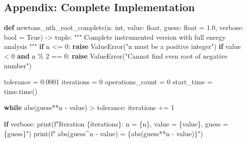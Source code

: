 \documentclass[
  letterpaper,
  DIV=11,
  numbers=noendperiod]{scrartcl}
\newenvironment{Shaded}{\begin{snugshade}}{\end{snugshade}}
\newcommand{\BuiltInTok}[1]{\textcolor[rgb]{0.00,0.23,0.31}{#1}}
\newcommand{\CommentTok}[1]{\textcolor[rgb]{0.37,0.37,0.37}{#1}}
\newcommand{\ControlFlowTok}[1]{\textcolor[rgb]{0.00,0.23,0.31}{\textbf{#1}}}
\newcommand{\DecValTok}[1]{\textcolor[rgb]{0.68,0.00,0.00}{#1}}
\newcommand{\FloatTok}[1]{\textcolor[rgb]{0.68,0.00,0.00}{#1}}
\newcommand{\KeywordTok}[1]{\textcolor[rgb]{0.00,0.23,0.31}{\textbf{#1}}}
\newcommand{\NormalTok}[1]{\textcolor[rgb]{0.00,0.23,0.31}{#1}}
\newcommand{\OperatorTok}[1]{\textcolor[rgb]{0.37,0.37,0.37}{#1}}
\newcommand{\PreprocessorTok}[1]{\textcolor[rgb]{0.68,0.00,0.00}{#1}}
\newcommand{\SpecialCharTok}[1]{\textcolor[rgb]{0.37,0.37,0.37}{#1}}
\newcommand{\SpecialStringTok}[1]{\textcolor[rgb]{0.13,0.47,0.30}{#1}}
\newcommand{\StringTok}[1]{\textcolor[rgb]{0.13,0.47,0.30}{#1}}
\newcommand{\VariableTok}[1]{\textcolor[rgb]{0.07,0.07,0.07}{#1}}
\begin{document}
\subsection{Appendix: Complete
Implementation}\label{appendix-complete-implementation}

\begin{Shaded}
\begin{Highlighting}[]
\KeywordTok{def}\NormalTok{ newtons\_nth\_root\_complete(n: }\BuiltInTok{int}\NormalTok{, value: }\BuiltInTok{float}\NormalTok{, guess: }\BuiltInTok{float} \OperatorTok{=} \FloatTok{1.0}\NormalTok{, verbose: }\BuiltInTok{bool} \OperatorTok{=} \VariableTok{True}\NormalTok{) }\OperatorTok{{-}\textgreater{}} \BuiltInTok{tuple}\NormalTok{:}
    \CommentTok{"""}
\CommentTok{    Complete instrumented version with full energy analysis}
\CommentTok{    """}
    \ControlFlowTok{if}\NormalTok{ n }\OperatorTok{\textless{}=} \DecValTok{0}\NormalTok{:}
        \ControlFlowTok{raise} \PreprocessorTok{ValueError}\NormalTok{(}\StringTok{"n must be a positive integer"}\NormalTok{)}
    \ControlFlowTok{if}\NormalTok{ value }\OperatorTok{\textless{}} \DecValTok{0} \KeywordTok{and}\NormalTok{ n }\OperatorTok{\%} \DecValTok{2} \OperatorTok{==} \DecValTok{0}\NormalTok{:}
        \ControlFlowTok{raise} \PreprocessorTok{ValueError}\NormalTok{(}\StringTok{"Cannot find even root of negative number"}\NormalTok{)}
    
\NormalTok{    tolerance }\OperatorTok{=} \FloatTok{0.0001}
\NormalTok{    iterations }\OperatorTok{=} \DecValTok{0}
\NormalTok{    operations\_count }\OperatorTok{=} \DecValTok{0}
\NormalTok{    start\_time }\OperatorTok{=}\NormalTok{ time.time()}
    
    \ControlFlowTok{while} \BuiltInTok{abs}\NormalTok{(guess}\OperatorTok{**}\NormalTok{n }\OperatorTok{{-}}\NormalTok{ value) }\OperatorTok{\textgreater{}}\NormalTok{ tolerance:}
\NormalTok{        iterations }\OperatorTok{+=} \DecValTok{1}
        
        \ControlFlowTok{if}\NormalTok{ verbose:}
            \BuiltInTok{print}\NormalTok{(}\SpecialStringTok{f"Iteration }\SpecialCharTok{\{}\NormalTok{iterations}\SpecialCharTok{\}}\SpecialStringTok{: n = }\SpecialCharTok{\{}\NormalTok{n}\SpecialCharTok{\}}\SpecialStringTok{, value = }\SpecialCharTok{\{}\NormalTok{value}\SpecialCharTok{\}}\SpecialStringTok{, guess = }\SpecialCharTok{\{}\NormalTok{guess}\SpecialCharTok{\}}\SpecialStringTok{"}\NormalTok{)}
            \BuiltInTok{print}\NormalTok{(}\SpecialStringTok{f"   abs(guess\^{}n {-} value) = }\SpecialCharTok{\{}\BuiltInTok{abs}\NormalTok{(guess}\OperatorTok{**}\NormalTok{n }\OperatorTok{{-}}\NormalTok{ value)}\SpecialCharTok{\}}\SpecialStringTok{"}\NormalTok{)}
        

\end{Highlighting}
\end{Shaded}
\end{document}
